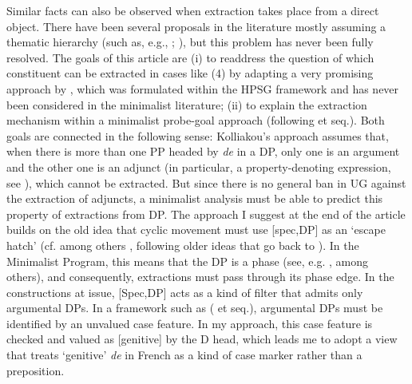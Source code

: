 \documentclass[output=paper]{langsci/langscibook}
\begin{document}
\ea%
    \label{ex:mensch:4}
    \z
\z

Similar facts can also be observed when extraction takes place from a direct object. There have been several proposals in the literature mostly assuming a thematic hierarchy (such as, e.g., \citealt{Pollock1989}; \citealt{Godard1992}), but this problem has never been fully resolved. The goals of this article are (i) to readdress the question of which constituent can be extracted in cases like (4) by adapting a very promising approach by \citet{Kolliakou1999}, which was formulated within the HPSG framework and has never been considered in the minimalist literature; (ii) to explain the extraction mechanism within a minimalist probe-goal approach (following \citealt{Chomsky2000} et seq.). Both goals are connected in the following sense: Kolliakou’s approach assumes that, when there is more than one PP headed by \textit{de} in a DP, only one is an argument and the other one is an adjunct (in particular, a property-denoting expression, see \citealt{Chierchia1982,Chierchia1985}), which cannot be extracted. But since there is no general ban in UG against the extraction of adjuncts, a minimalist analysis must be able to predict this property of extractions from DP. The approach I suggest at the end of the article builds on the old idea that cyclic movement must use [spec,DP] as an ‘escape hatch’ (cf. among others \citealt{Gavruseva2000}, following older ideas that go back to \citealt{Cinque1980}). In the Minimalist Program, this means that the DP is a phase (see, e.g. \citealt{Heck2008,Heck2009}, among others), and consequently, extractions must pass through its phase edge. In the constructions at issue, [Spec,DP] acts as a kind of filter that admits only argumental DPs. In a framework such as \citeauthor{Chomsky2000} (\citeyear{Chomsky2000} et seq.), argumental DPs must be identified by an unvalued case feature. In my approach, this case feature is checked and valued as [genitive] by the D head, which leads me to adopt a view that treats ‘genitive’ \textit{de} in French as a kind of case marker rather than a preposition.
\end{document}
